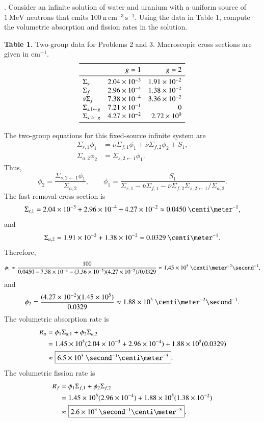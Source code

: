 . Consider an infinite solution of water and uranium
with a uniform source of $1~\mathrm{MeV}$ neutrons that emits
$100~\mathrm{n\,cm^{-3}\,s^{-1}}$. Using the data in Table 1, compute the
volumetric absorption and fission rates in the solution.

\begin{center}
\textbf{Table 1.} Two-group data for Problems 2 and 3. Macroscopic cross
sections are given in $\mathrm{cm^{-1}}$.
\[
\begin{array}{lrr}
\toprule
 & g=1 & g=2\\
\midrule
\Sigma_\gamma & 2.04\times10^{-3} & 1.91\times10^{-2}\\
\Sigma_f & 2.96\times10^{-4} & 1.38\times10^{-2}\\
\bar{\nu}\Sigma_f & 7.38\times10^{-4} & 3.36\times10^{-2}\\
\Sigma_{s,1\gets g} & 7.21\times10^{-1} & 0\\
\Sigma_{s,2\gets g} & 4.27\times10^{-2} & 2.72\times10^0\\
\bottomrule
\end{array}
\]
\end{center}

\begin{adaptedsolution}
The two-group equations for this fixed-source infinite system are
\begin{align*}
 \Sigma_{r,1}\phi_1
 &=\bar{\nu}\Sigma_{f,1}\phi_1
  +\bar{\nu}\Sigma_{f,2}\phi_2+S_1,\\
 \Sigma_{a,2}\phi_2&=\Sigma_{s,2\gets1}\phi_1.
\end{align*}
Thus,
\[
 \phi_2=\frac{\Sigma_{s,2\gets1}\phi_1}{\Sigma_{a,2}},
 \qquad
 \phi_1=
 \frac{S_1}
 {\Sigma_{r,1}-\bar{\nu}\Sigma_{f,1}
 -\bar{\nu}\Sigma_{f,2}\Sigma_{s,2\gets1}/\Sigma_{a,2}}.
\]
The fast removal cross section is
\[
 \Sigma_{r,1}
 =2.04\times10^{-3}+2.96\times10^{-4}+4.27\times10^{-2}
 \approx0.0450~\centi\meter^{-1},
\]
and
\[
 \Sigma_{a,2}=1.91\times10^{-2}+1.38\times10^{-2}
 =0.0329~\centi\meter^{-1}.
\]
Therefore,
\[
 \phi_1\approx
 \frac{100}
 {0.0450-7.38\times10^{-4}
 -(3.36\times10^{-2})(4.27\times10^{-2})/0.0329}
 \approx1.45\times10^5~\centi\meter^{-2}\second^{-1},
\]
and
\[
 \phi_2=\frac{(4.27\times10^{-2})(1.45\times10^5)}{0.0329}
 \approx1.88\times10^5~\centi\meter^{-2}\second^{-1}.
\]
The volumetric absorption rate is
\[
\begin{aligned}
 R_a
 &=\phi_1\Sigma_{a,1}+\phi_2\Sigma_{a,2}\\
 &=1.45\times10^5(2.04\times10^{-3}+2.96\times10^{-4})
  +1.88\times10^5(0.0329)\\
 &\approx \boxed{6.5\times10^3~\second^{-1}\centi\meter^{-3}}.
\end{aligned}
\]
The volumetric fission rate is
\[
\begin{aligned}
 R_f
 &=\phi_1\Sigma_{f,1}+\phi_2\Sigma_{f,2}\\
 &=1.45\times10^5(2.96\times10^{-4})
  +1.88\times10^5(1.38\times10^{-2})\\
 &\approx \boxed{2.6\times10^3~\second^{-1}\centi\meter^{-3}}.
\end{aligned}
\]
\end{adaptedsolution}

